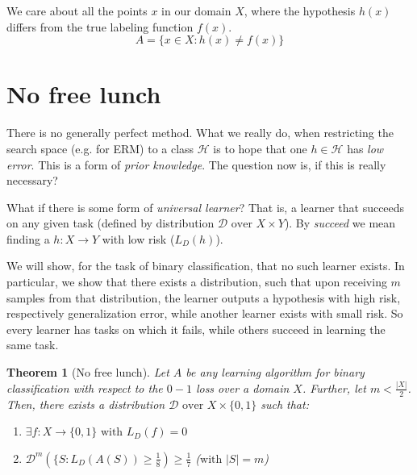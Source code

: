 \documentclass{scrarticle}
\newtheorem{theorem}{Theorem}[section]
\begin{document}
We care about all the points $x$ in our domain $X$, where the hypothesis $h(x)$ differs from the true labeling function $f(x)$.
\begin{equation*}
    A = \{x \in X: h(x) \neq f(x)\}
\end{equation*}

\section{No free lunch}
There is no generally perfect method. What we really do, when restricting the search space (e.g. for ERM) to a class $\mathcal{H}$ is to hope that one $h \in \mathcal{H}$ has \textit{low error}. This is a form of \textit{prior knowledge}. The question now is, if this is really necessary?

What if there is some form of \textit{universal learner}? That is, a learner that succeeds on any given task (defined by distribution $\mathcal{D} \text{ over } X \times Y$). By \textit{succeed} we mean finding a $h: X \to Y$ with low risk ($L_D(h)$). 

We will show, for the task of binary classification, that no such learner exists. In particular, we show that there exists a distribution, such that upon receiving $m$ samples from that distribution, the learner outputs a hypothesis with high risk, respectively generalization error, while another learner exists with small risk. So every learner has tasks on which it fails, while others succeed in learning the same task. 

\begin{theorem}[No free lunch]
Let $A$ be any learning algorithm for binary classification with respect to the $0-1$ loss over a domain $X$. Further, let $m < \frac{|X|}{2}$. Then, there exists a distribution $\mathcal{D} \text{ over } X \times \{0,1\}$ such that: 
\begin{enumerate}
    \item $\exists f: X \to \{0,1\} \text{ with } L_D(f) = 0$ 
    \item $\mathcal{D}^m(\{S:L_D(A(S)) \geq \frac{1}{8})\geq \frac{1}{7}$ \hspace{1cm} ($\text{with } |S|=m$)
\end{enumerate}
\end{theorem}
\end{document}
